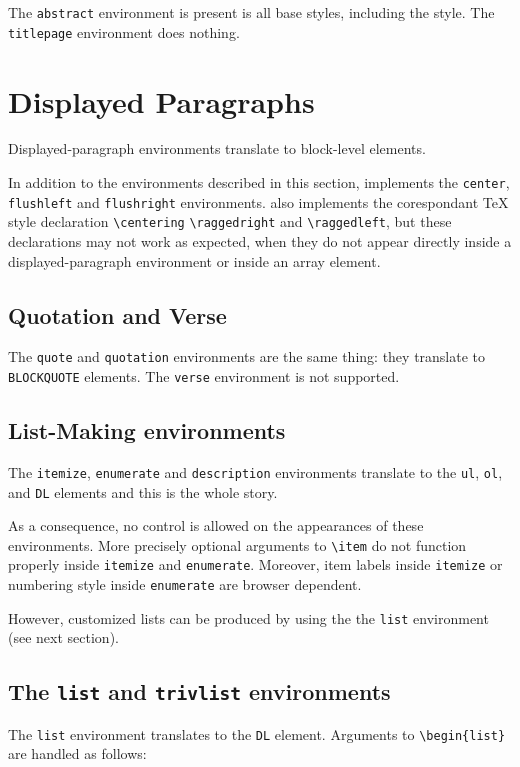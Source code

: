 The \verb+abstract+ environment is present is all base styles,
including the  style.
The \verb+titlepage+ environment does nothing.

\section{Displayed Paragraphs}
Displayed-paragraph environments translate to block-level
elements.

In addition to the environments described in this section,
\hevea{} implements the \verb+center+, \verb+flushleft+ and
\verb+flushright+ environments.
\hevea{} also implements the corespondant \TeX{} style declaration
\verb+\centering+ \verb+\raggedright+ and \verb+\raggedleft+,
but these declarations may not work as expected, when they do not
appear directly inside a displayed-paragraph environment or inside an array
element.



\subsection{Quotation and Verse}
The \verb+quote+ and \verb+quotation+ environments are the same thing: they
translate to \verb+BLOCKQUOTE+ elements.
The \verb+verse+ environment is not supported.

\subsection{List-Making environments}
The \verb+itemize+, \verb+enumerate+ and \verb+description+
environments translate to the \verb+ul+, \verb+ol+, and
\verb+DL+ elements and this is the whole story.

As a consequence, no control is allowed on the appearances of these
environments.  More precisely optional arguments to \verb+\item+ do not
function properly inside \verb+itemize+ and \verb+enumerate+.  Moreover, item
labels inside \verb+itemize+ or numbering style inside \verb+enumerate+
are browser dependent.

However, customized lists can be produced by using the
the \texttt{list} environment (see next section).


\subsection{The \protect\texttt{list} and \protect\texttt{trivlist}
environments}
The \verb+list+ environment translates to the
\verb+DL+ element.
Arguments to \verb+\begin{list}+ are handled as follows:

